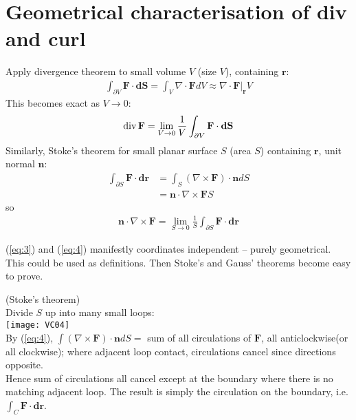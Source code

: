 \documentclass[a4paper]{article}
\begin{document}
\section{Geometrical characterisation of div and curl}
Apply divergence theorem to small volume $V$ (size $V$), containing $\mathbf{r}$:
\begin{equation*}
\begin{aligned}
\int_{\partial V} \mathbf{F}\cdot \mathbf{dS} = \int_V \nabla\cdot\mathbf{F}dV \approx \nabla\cdot\mathbf{F}|_\mathbf{r} V
\end{aligned}
\end{equation*}
This becomes exact as $V\to 0$:
\begin{equation}\label{eq:3}
\begin{aligned}
\operatorname{div} \mathbf{F} = \lim_{V\to 0} \frac{1}{V} \int_{\partial V} \mathbf{F}\cdot \mathbf{dS}
\end{aligned}
\end{equation}
Similarly, Stoke's theorem for small planar surface $S$ (area $S$) containing $\mathbf{r}$, unit normal $\mathbf{n}$:
\begin{equation*}
\begin{aligned}
\int_{\partial S} \mathbf{F}\cdot\mathbf{dr} &= \int_S \left(\nabla\times\mathbf{F}\right)\cdot\mathbf{n} dS\\
&= \mathbf{n}\cdot\nabla\times\mathbf{F} S
\end{aligned}
\end{equation*}
so
\begin{equation}\label{eq:4}
\begin{aligned}
\mathbf{n}\cdot\nabla\times\mathbf{F}=\lim_{S\to 0} \frac{1}{S} \int_{\partial S} \mathbf{F}\cdot\mathbf{dr}
\end{aligned}
\end{equation}

(\ref{eq:3}) and (\ref{eq:4}) manifestly coordinates independent -- purely geometrical.\\
This could be used as definitions. Then Stoke's and Gauss' theorems become easy to prove.\\

\begin{eg} (Stoke's theorem)\\
Divide $S$ up into many small loops:\\
\texttt{[image: VC04]}\\
By (\ref{eq:4}), $\int \left(\nabla\times\mathbf{F}\right)\cdot\mathbf{n}dS = $ sum of all circulations of $\mathbf{F}$, all anticlockwise(or all clockwise); where adjacent loop contact, circulations cancel since directions opposite.\\
Hence sum of circulations all cancel except at the boundary where there is no matching adjacent loop. The result is simply the circulation on the boundary, i.e. $\int_C \mathbf{F}\cdot\mathbf{dr}$.
\end{eg}
\end{document}
